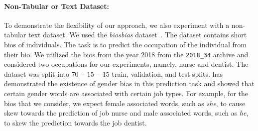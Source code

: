 \paragraph{Non-Tabular or Text Dataset:}
To demonstrate the flexibility of our approach, we also experiment with a non-tabular text dataset. We used the \textit{biosbias} dataset~\cite{de2019bias}. The dataset contains short bios of individuals. The task is to predict the occupation of the individual from their bio.
We utilized the bios from the year 2018 from the \texttt{2018\_34} archive and  considered two occupations for our experiments, namely, nurse and dentist. The dataset was split into $70-15-15$ train, validation, and test splits. \cite{de2019bias} has demonstrated the existence of gender bias in this prediction task and showed that certain gender words are associated with certain job types. For example, for the bios that we consider, we expect female associated words, such as \textit{she}, to cause skew towards the prediction of job nurse and male associated words, such as \textit{he}, to skew the prediction towards the job dentist.



